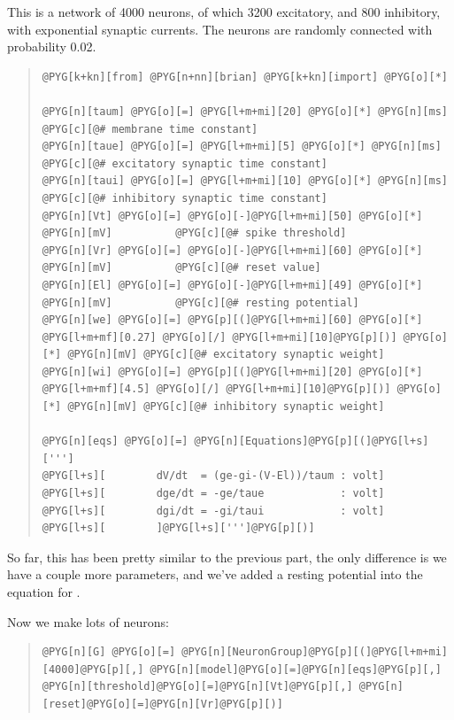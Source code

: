 \documentclass[letterpaper,10pt,english]{manual}
\begin{document}
This is a network of 4000 neurons, of which 3200 excitatory, and 800 inhibitory, with
exponential synaptic currents. The neurons are randomly connected with probability 0.02.
\begin{quote}

\begin{Verbatim}[commandchars=@\[\]]
@PYG[k+kn][from] @PYG[n+nn][brian] @PYG[k+kn][import] @PYG[o][*]

@PYG[n][taum] @PYG[o][=] @PYG[l+m+mi][20] @PYG[o][*] @PYG[n][ms]          @PYG[c][@# membrane time constant]
@PYG[n][taue] @PYG[o][=] @PYG[l+m+mi][5] @PYG[o][*] @PYG[n][ms]          @PYG[c][@# excitatory synaptic time constant]
@PYG[n][taui] @PYG[o][=] @PYG[l+m+mi][10] @PYG[o][*] @PYG[n][ms]          @PYG[c][@# inhibitory synaptic time constant]
@PYG[n][Vt] @PYG[o][=] @PYG[o][-]@PYG[l+m+mi][50] @PYG[o][*] @PYG[n][mV]          @PYG[c][@# spike threshold]
@PYG[n][Vr] @PYG[o][=] @PYG[o][-]@PYG[l+m+mi][60] @PYG[o][*] @PYG[n][mV]          @PYG[c][@# reset value]
@PYG[n][El] @PYG[o][=] @PYG[o][-]@PYG[l+m+mi][49] @PYG[o][*] @PYG[n][mV]          @PYG[c][@# resting potential]
@PYG[n][we] @PYG[o][=] @PYG[p][(]@PYG[l+m+mi][60] @PYG[o][*] @PYG[l+m+mf][0.27] @PYG[o][/] @PYG[l+m+mi][10]@PYG[p][)] @PYG[o][*] @PYG[n][mV] @PYG[c][@# excitatory synaptic weight]
@PYG[n][wi] @PYG[o][=] @PYG[p][(]@PYG[l+m+mi][20] @PYG[o][*] @PYG[l+m+mf][4.5] @PYG[o][/] @PYG[l+m+mi][10]@PYG[p][)] @PYG[o][*] @PYG[n][mV] @PYG[c][@# inhibitory synaptic weight]

@PYG[n][eqs] @PYG[o][=] @PYG[n][Equations]@PYG[p][(]@PYG[l+s][''']
@PYG[l+s][        dV/dt  = (ge-gi-(V-El))/taum : volt]
@PYG[l+s][        dge/dt = -ge/taue            : volt]
@PYG[l+s][        dgi/dt = -gi/taui            : volt]
@PYG[l+s][        ]@PYG[l+s][''']@PYG[p][)]
\end{Verbatim}
\end{quote}

So far, this has been pretty similar to the previous part, the only
difference is we have a couple more parameters, and we've added a
resting potential  into the equation for .

Now we make lots of neurons:
\begin{quote}

\begin{Verbatim}[commandchars=@\[\]]
@PYG[n][G] @PYG[o][=] @PYG[n][NeuronGroup]@PYG[p][(]@PYG[l+m+mi][4000]@PYG[p][,] @PYG[n][model]@PYG[o][=]@PYG[n][eqs]@PYG[p][,] @PYG[n][threshold]@PYG[o][=]@PYG[n][Vt]@PYG[p][,] @PYG[n][reset]@PYG[o][=]@PYG[n][Vr]@PYG[p][)]
\end{Verbatim}
\end{quote}
\end{document}
